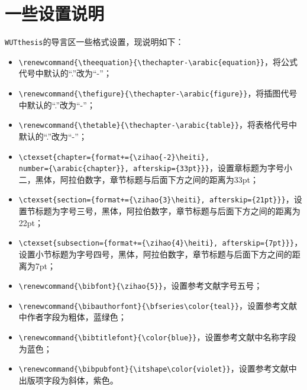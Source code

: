 \section{一些设置说明}

\par \texttt{WUTthesis}的导言区一些格式设置，现说明如下：
\begin{itemize}
\item \verb"\renewcommand{\theequation}{\thechapter-\arabic{equation}}"，将公式代号中默认的“.”改为“-”；
\item \verb"\renewcommand{\thefigure}{\thechapter-\arabic{figure}}"，将插图代号中默认的“.”改为“-”；
\item \verb"\renewcommand{\thetable}{\thechapter-\arabic{table}}"，将表格代号中默认的“.”改为“-”；
\item \verb"\ctexset{chapter={format+={\zihao{-2}\heiti}," \\ \verb"number={\arabic{chapter}}, afterskip={33pt}}}"，设置章标题为字号小二，黑体，阿拉伯数字，章节标题与后面下方之间的距离为33pt；
\item \verb"\ctexset{section={format+={\zihao{3}\heiti}, afterskip={21pt}}}"，设置节标题为字号三号，黑体，阿拉伯数字，章节标题与后面下方之间的距离为22pt；
\item \verb"\ctexset{subsection={format+={\zihao{4}\heiti}, afterskip={7pt}}}"，设置小节标题为字号四号，黑体，阿拉伯数字，章节标题与后面下方之间的距离为7pt；
\item \verb"\renewcommand{\bibfont}{\zihao{5}}"，设置参考文献字号五号；
\item \verb"\renewcommand{\bibauthorfont}{\bfseries\color{teal}}"，设置参考文献中作者字段为粗体，蓝绿色；
\item \verb"\renewcommand{\bibtitlefont}{\color{blue}}"，设置参考文献中名称字段为蓝色；
\item \verb"\renewcommand{\bibpubfont}{\itshape\color{violet}}"，设置参考文献中出版项字段为斜体，紫色。
\end{itemize}



